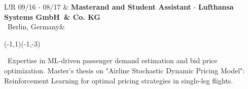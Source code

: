 \documentclass[a4paper, 12]{scrartcl}
\newcommand{\companyName}[1]{\textbf{\textcolor{secondaryColor}{#1}}}
\newcommand{\jobTitle}[1]{\textbf{#1}}
\newcommand{\fromBis}[2]{\scriptsize{#1 - #2}}
\newcommand{\cvLocation}[2]{\scriptsize{\ #1, #2}}
\newcommand{\spaceBetweenCvEntry}{\\[6pt]}
\newcommand{\sbt}{\ \ \ \begin{picture}(-1,1)(-1,-3)\circle*{3}\end{picture}  \  }
\newcommand{\berlin}{\cvLocation{Berlin}{Germany}}
\newcommand{\gmbh}{GmbH}
\newcommand{\lsy}{Lufthansa Systems \gmbh \ \& Co. KG}
\newcommand\VRule{\color{lightGray}\vrule width 0.25pt}
\begin{document}
\begin{tabular}{L!{\VRule}R}
		\fromBis{09/16}{08/17} & \jobTitle{Masterand and Student Assistant} - \companyName{\lsy}\\ 
		\berlin & \sbt Expertise in ML-driven passenger demand estimation and bid price optimization. Master's thesis on "Airline Stochastic Dynamic Pricing Model": Reinforcement Learning for optimal pricing strategies in single-leg flights.

            \begin{comment}		
                \fromBis{04/2014}{09/2015} & \jobTitle{Student Assistant} - \companyName{Wintershall Erdgas Handelhaus GmbH \& Co. KG - BASF}\\
		      \footnotesize{Berlin, Germany} & Database management -- Logistics \\
		      &\\[-9pt]
		      & Gas Transport Optimization Tool: Managed, maintained databases. QA testing of new modules for productive use.\\
		
		
    		01/2012 - 02/2012& \jobTitle{Engineering Intern} - \companyName{Minera Esperanza S.A.}\\
    		\footnotesize{Santiago, Chile}&\\[-22pt]
    		& \sbt \ Analyzed procurement process and evaluated financial risk of prospective suppliers and contractors.\\[-12pt]
    		& \sbt \ Designed and developed new procurement assessment methodology: multivariate model of financial ratios, increasing flexibility without incurring in additional risk levels.
    		\spaceBetweenCvEntry
    		
    		06/2011 - 07/2011&\textbf{Intern}, Planning and Control Department - ABB S.A.\\
    		\footnotesize{Santiago, Chile}&\\[-12pt]
    		
    		& Monitored projects, developed periodic financial reports and collaborated closely with project managers from process automation division.\spaceBetweenCvEntry
    		01/2010 - 02/2010 & \textbf{Research Assistant} - Program of Studies and Research on Energy - \\ \footnotesize{Santiago, Chile}&\textsc{Universidad de Chile}\\
    		\\[-12pt]
    		& Contributed as assistant and co-researcher in the National Plan of Energetic Efficiency 2010 -- 20 for the Chilean government.\\
            \end{comment}
		
	\end{tabular}
	
\end{document}
